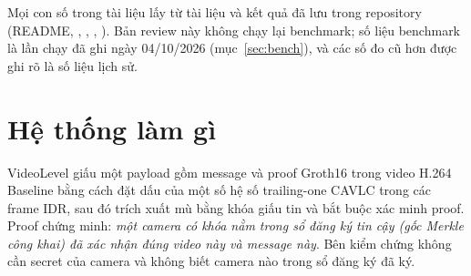 \documentclass[10pt,a4paper]{article}
\begin{document}
Mọi con số trong tài liệu lấy từ tài liệu và kết quả đã lưu trong repository (README, , , , ). Bản review này không chạy lại benchmark; số liệu benchmark là lần chạy đã ghi ngày 04/10/2026 (mục~\ref{sec:bench}), và các số đo cũ hơn được ghi rõ là số liệu lịch sử.

\section{Hệ thống làm gì}

VideoLevel giấu một payload gồm message và proof Groth16 trong video H.264 Baseline bằng cách đặt dấu của một số hệ số trailing-one CAVLC trong các frame IDR, sau đó trích xuất mù bằng khóa giấu tin và bắt buộc xác minh proof. Proof chứng minh: \emph{một camera có khóa nằm trong sổ đăng ký tin cậy (gốc Merkle công khai) đã xác nhận đúng video này và message này}. Bên kiểm chứng không cần secret của camera và không biết camera nào trong sổ đăng ký đã ký.
\end{document}
